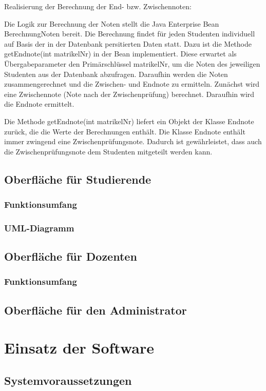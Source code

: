 \documentclass[12pt,a4paper,parskip]{scrreprt}
\begin{document}
Realisierung der Berechnung der End- bzw. Zwischennoten:

Die Logik zur Berechnung der Noten stellt die Java Enterprise Bean BerechnungNoten bereit. Die Berechnung findet für jeden Studenten individuell auf Basis der in der Datenbank persitierten Daten statt. 
Dazu ist die Methode getEndnote(int matrikelNr) in der Bean implementiert. Diese erwartet als Übergabeparameter den Primärschlüssel matrikelNr, um die Noten des jeweiligen Studenten aus der Datenbank abzufragen. Daraufhin werden die Noten zusammengerechnet und die Zwischen- und Endnote zu ermitteln.
Zunächst wird eine Zwischennote (Note nach der Zwischenprüfung) berechnet. Daraufhin wird die Endnote ermittelt.

Die Methode getEndnote(int matrikelNr) liefert ein Objekt der Klasse Endnote zurück, die die Werte der Berechnungen enthält. Die Klasse Endnote enthält immer zwingend eine Zwischenprüfungsnote. Dadurch ist gewährleistet, dass auch die Zwischenprüfungsnote dem Studenten mitgeteilt werden kann.
\section{Oberfläche für Studierende}
\subsection{Funktionsumfang}
\subsection{UML-Diagramm}
\section{Oberfläche für Dozenten}
\subsection{Funktionsumfang}
\section{Oberfläche für den Administrator}
\chapter{Einsatz der Software}
\section{Systemvoraussetzungen}
\end{document}
